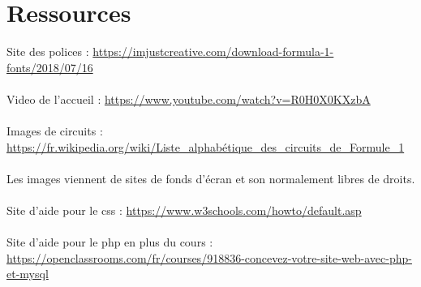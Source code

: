 \documentclass{article}
\begin{document}
\section{Ressources}

Site des polices : \url{https://imjustcreative.com/download-formula-1-fonts/2018/07/16}\\\\
Video de l'accueil : \url{https://www.youtube.com/watch?v=R0H0X0KXzbA}\\\\
Images de circuits : \url{https://fr.wikipedia.org/wiki/Liste_alphabétique_des_circuits_de_Formule_1}\\\\
Les images viennent de sites de fonds d'écran et son normalement libres de droits.\\\\
Site d'aide pour le css : \url{https://www.w3schools.com/howto/default.asp}\\\\
Site d'aide pour le php en plus du cours :\\
\url{https://openclassrooms.com/fr/courses/918836-concevez-votre-site-web-avec-php-et-mysql}\\\\
\end{document}
